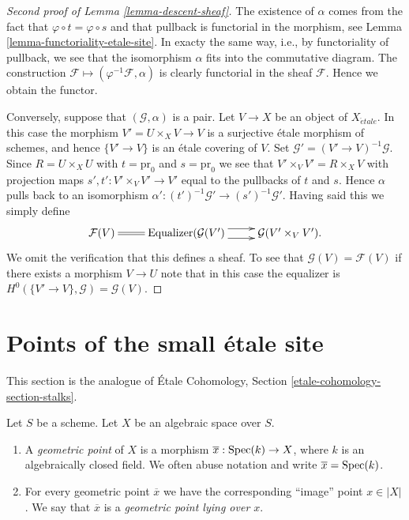 \begin{proof}[Second proof of Lemma \ref{lemma-descent-sheaf}]
The existence of $\alpha$ comes from the fact that
$\varphi \circ t = \varphi \circ s$ and that pullback is
functorial in the morphism, see
Lemma \ref{lemma-functoriality-etale-site}.
In exacty the same way, i.e., by functoriality of pullback, we see
that the isomorphism $\alpha$ fits into the commutative diagram.
The construction $\mathcal{F} \mapsto (\varphi^{-1}\mathcal{F}, \alpha)$
is clearly functorial in the sheaf $\mathcal{F}$.
Hence we obtain the functor.

\medskip\noindent
Conversely, suppose that $(\mathcal{G}, \alpha)$ is a pair.
Let $V \to X$ be an object of $X_{\acute{e}tale}$.
In this case the morphism $V' = U \times_X V \to V$ is a surjective \'etale
morphism of schemes, and hence $\{V' \to V\}$ is an \'etale
covering of $V$. Set $\mathcal{G}' = (V' \to V)^{-1}\mathcal{G}$.
Since $R = U \times_X U$ with $t = \text{pr}_0$
and $s = \text{pr}_0$ we see that $V' \times_V V' = R \times_X V$
with projection maps $s', t' : V' \times_V V' \to V'$ equal to the pullbacks
of $t$ and $s$. Hence $\alpha$ pulls back to an isomorphism
$\alpha' : (t')^{-1}\mathcal{G}' \to (s')^{-1}\mathcal{G}'$. Having said this
we simply define
$$
\xymatrix{
\mathcal{F}(V) \ar@{=}[r] &
\text{Equalizer}(\mathcal{G}(V') \ar@<1ex>[r] \ar@<-1ex>[r] &
\mathcal{G}(V' \times_V V').
}
$$
We omit the verification that this defines a sheaf. To see that
$\mathcal{G}(V) = \mathcal{F}(V)$ if there exists a morphism $V \to U$
note that in this case the equalizer is
$H^0(\{V' \to V\}, \mathcal{G}) = \mathcal{G}(V)$.
\end{proof}







\section{Points of the small \'etale site}
\label{section-points-small-etale-site}

\noindent
This section is the analogue of
\'Etale Cohomology, Section
\ref{etale-cohomology-section-stalks}.

\begin{definition}
\label{definition-geometric-point}
Let $S$ be a scheme. Let $X$ be an algebraic space over $S$.
\begin{enumerate}
\item A {\it geometric point} of $X$ is a morphism
$\overline{x} : \mathop{\rm Spec}(k) \to X$, where $k$ is an algebraically
closed field. We often abuse notation and
write $\overline{x} = \mathop{\rm Spec}(k)$.
\item For every geometric point $\overline{x}$ we have the corresponding
``image'' point $x \in |X|$. We say that $\overline{x}$ is a
{\it geometric point lying over $x$}.
\end{enumerate}
\end{definition}

